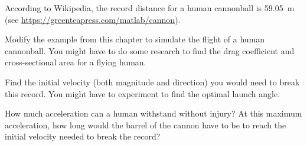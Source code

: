According to Wikipedia, the record distance for a human cannonball is \SI {59.05}{\meter} (see \url{https://greenteapress.com/matlab/cannon}).

Modify the example from this chapter to simulate the flight of a human cannonball.  You might have to do some research to find the drag coefficient and cross-sectional area for a flying human.

Find the initial velocity (both magnitude and direction) you would need to break this record.  You might have to experiment to find the optimal launch angle.

How much acceleration can a human withstand without injury?  At this maximum acceleration, how long would the barrel of the cannon have to be to reach the initial velocity needed to break the record?




